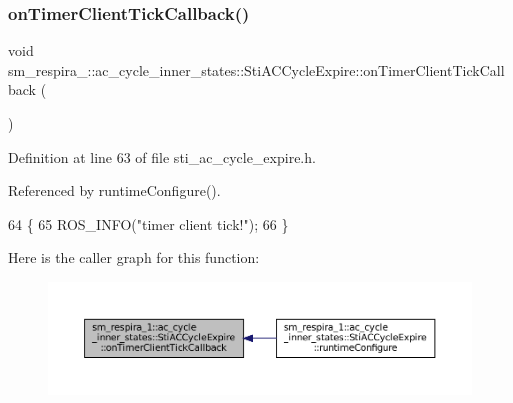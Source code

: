 \subsubsection{\texorpdfstring{on\+Timer\+Client\+Tick\+Callback()}{onTimerClientTickCallback()}}
{\footnotesize\ttfamily void sm\+\_\+respira\+\_\+::ac\+\_\+cycle\+\_\+inner\+\_\+states\+::\+Sti\+A\+C\+Cycle\+Expire\+::on\+Timer\+Client\+Tick\+Callback (\begin{DoxyParamCaption}{ }\end{DoxyParamCaption})\hspace{0.3cm}{\ttfamily [inline]}}



Definition at line 63 of file sti\+\_\+ac\+\_\+cycle\+\_\+expire.\+h.



Referenced by runtime\+Configure().


\begin{DoxyCode}
64   \{
65     ROS\_INFO(\textcolor{stringliteral}{"timer client tick!"});
66   \}
\end{DoxyCode}
Here is the caller graph for this function\+:
\nopagebreak
\begin{figure}[H]
\begin{center}
\leavevmode
\includegraphics[width=350pt]{structsm__respira__1_1_1ac__cycle__inner__states_1_1StiACCycleExpire_a9f01d2f0b1003702adfb6dbac0a75e8d_icgraph}
\end{center}
\end{figure}
\mbox{\label{structsm__respira__1_1_1ac__cycle__inner__states_1_1StiACCycleExpire_a53776f163d9983ec3d4104b858d77eb0}} 
